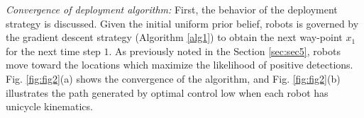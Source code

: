 \documentclass[journal]{IEEEtran}
\begin{document}
\textit{Convergence of deployment algorithm:}
First, the behavior of the deployment strategy is discussed. Given the initial uniform prior belief, robots is governed by the gradient descent strategy (Algorithm \ref{alg1}) to obtain the next way-point $x_1$ for the next time step $1$. As previously noted in the Section \ref{sec:sec5}, robots move toward the locations which maximize the likelihood of positive detections.
Fig. \ref{fig:fig2}(a) shows the convergence of the algorithm, and Fig. \ref{fig:fig2}(b) illustrates the path generated by optimal control low when each robot has unicycle kinematics. 
\end{document}

